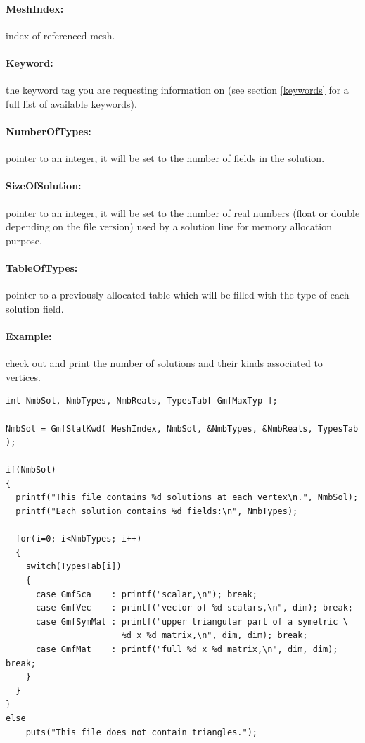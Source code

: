 \documentclass[a4paper,12pt]{article}
\begin{document}
\paragraph{MeshIndex:} index of referenced mesh.

\paragraph{Keyword:} the keyword tag you are requesting information on (see section \ref{keywords} for a full list of available keywords).

\paragraph{NumberOfTypes:} pointer to an integer, it will be set to the number of fields in the solution.

\paragraph{SizeOfSolution:} pointer to an integer, it will be set to the number of real numbers (float or double depending on the file version) used by a solution line for memory allocation purpose.

\paragraph{TableOfTypes:} pointer to a previously allocated table which will be filled with the type of each solution field.

\paragraph{Example:} check out and print the number of solutions and their kinds associated to vertices.

\begin{tt}
\begin{verbatim}
int NmbSol, NmbTypes, NmbReals, TypesTab[ GmfMaxTyp ];

NmbSol = GmfStatKwd( MeshIndex, NmbSol, &NmbTypes, &NmbReals, TypesTab );

if(NmbSol)
{
  printf("This file contains %d solutions at each vertex\n.", NmbSol);
  printf("Each solution contains %d fields:\n", NmbTypes);

  for(i=0; i<NmbTypes; i++)
  {
    switch(TypesTab[i])
    {
      case GmfSca    : printf("scalar,\n"); break;
      case GmfVec    : printf("vector of %d scalars,\n", dim); break;
      case GmfSymMat : printf("upper triangular part of a symetric \
                       %d x %d matrix,\n", dim, dim); break;
      case GmfMat    : printf("full %d x %d matrix,\n", dim, dim); break;
    }
  }
}
else
    puts("This file does not contain triangles.");
\end{verbatim}
\end{tt}
\normalfont
\end{document}
